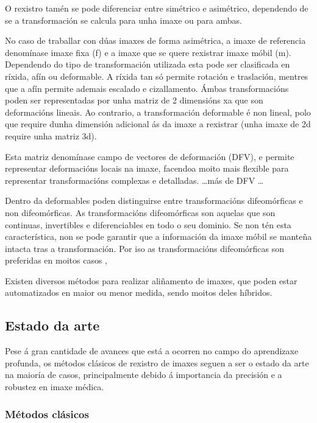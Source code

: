 O rexistro tamén se pode diferenciar entre simétrico e asimétrico, dependendo de se a transformación se calcula para unha imaxe ou para ambas.

No caso de traballar con dúas imaxes de forma asimétrica, a imaxe de referencia denomínase imaxe fixa (f) e a imaxe que se quere rexistrar imaxe móbil (m).
Dependendo do tipo de transformación utilizada esta pode ser clasificada en ríxida, afín ou deformable.
A ríxida tan só permite rotación e traslación, mentres que a afín permite ademais escalado e cizallamento.
Ámbas transformacións poden ser representadas por unha matriz de 2 dimensións xa que son deformacións lineais.
Ao contrario, a transformación deformable é non lineal, polo que require dunha dimensión adicional ás da imaxe a rexistrar (unha imaxe de 2d require unha matriz 3d).

Esta matriz denomínase campo de vectores de deformación (DFV), e permite representar deformacións locais na imaxe, facendoa moito mais flexible para representar transformacións complexas e detalladas.
\dots más de DFV \dots

Dentro da deformables poden distinguirse entre transformacións difeomórficas e non difeomórficas.
As transformacións difeomórficas son aquelas que son continuas, invertibles e diferenciables en todo o seu dominio.
Se non tén esta característica, non se pode garantir que a información da imaxe móbil se manteña intacta tras a transformación.
Por iso as transformacións difeomórficas son preferidas en moitos casos \cite{han2022diffeomorphicimageregistrationneural}, 

Existen diversos métodos para realizar aliñamento de imaxes, que poden estar automatizados en maior ou menor medida, sendo moitos deles híbridos. \cite{deeplernreview3dreg}


\subsection{Estado da arte}
\label{subsec:Estado da arte}

Pese á gran cantidade de avances que está a ocorren no campo do aprendizaxe profunda, os métodos clásicos de rexistro de imaxes seguen a ser o estado da arte na maioría de casos, 
principalmente debido á importancia da precisión e a robustez en imaxe médica.


\subsubsection{Métodos clásicos}
\label{subsubsec:Métodos clásicos}

